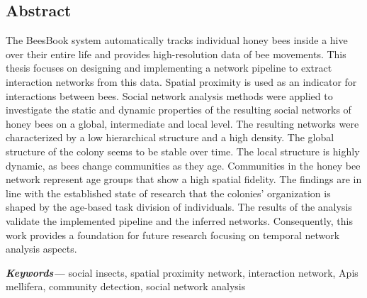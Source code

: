 %
\pagestyle{empty}
\providecommand{\keywords}[1]{\textbf{\textit{Keywords---}} #1}

\subsection*{Abstract}
The BeesBook system automatically tracks individual honey bees inside a hive over their entire life and provides high-resolution data of bee movements.
This thesis focuses on designing and implementing a network pipeline to extract interaction networks from this data.
Spatial proximity is used as an indicator for interactions between bees. Social network analysis methods were applied to investigate the static and dynamic properties of the resulting social networks of honey bees on a global, intermediate and local level.
The resulting networks were characterized by a low hierarchical structure and a high density. The global structure of the colony seems to be stable over time. The local structure is highly dynamic, as bees change communities as they age. 
Communities in the honey bee network represent age groups that show a high spatial fidelity.
The findings are in line with the established state of research that the colonies' organization is shaped by the age-based task division of individuals.
The results of the analysis validate the implemented pipeline and the inferred networks.
Consequently, this work provides a foundation for future research focusing on temporal network analysis aspects.

\vspace{5mm}
\keywords{social insects, spatial proximity network, interaction network, Apis mellifera, community detection, social network analysis}

\cleardoublepage
